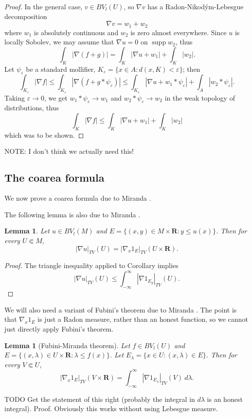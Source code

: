 \documentclass[reqno,12pt,letterpaper]{amsart}
\newcommand{\RR}{\mathbf{R}}
\DeclareMathOperator{\supp}{supp}
\newtheorem{lemma}[theorem]{Lemma}
\theoremstyle{definition}
\numberwithin{equation}{section}
\begin{document}
\begin{proof}
In the general case, $v \in BV_l(U)$, so $\nabla v$ has a Radon-Nikod\'ym-Lebesgue decomposition
$$\nabla v = w_1 + w_2$$
where $w_1$ is absolutely continuous and $w_2$ is zero almost everywhere.
Since $u$ is locally Sobolev, we may assume that $\nabla u = 0$ on $\supp w_2$, thus
$$\int_K |\nabla(f + g)| = \int_K |\nabla u + w_1| + \int_K |w_2|.$$
Let $\psi_\varepsilon$ be a standard mollifier, $K_\varepsilon = \{x \in A: d(x, K) < \varepsilon\}$; then
$$\int_{K_\varepsilon} |\nabla f| \leq \int_{K_\varepsilon} |\nabla (f + g * \psi_\varepsilon)| \leq \int_{K_\varepsilon} |\nabla u + w_1 * \psi_\varepsilon| + \int_A |w_2 * \psi_\varepsilon|.$$
Taking $\varepsilon \to 0$, we get $w_1 * \psi_\varepsilon \to w_1$ and $w_2 * \psi_\varepsilon \to w_2$ in the weak topology of distributions, thus
$$\int_K |\nabla f| \leq \int_K |\nabla u + w_1| + \int_K |w_2|$$
which was to be shown.
\end{proof}
NOTE: I don't think we actually need this!


\subsection{The coarea formula}
We now prove a coarea formula due to Miranda \cite[Teorema 1.6]{Miranda66}.

The following lemma is also due to Miranda \cite[Proposizione 1.9]{Miranda64}.
\begin{lemma}\label{Miranda coarea baby}
Let $u \in BV_l(M)$ and $E = \{(x, y) \in M \times \RR: y \leq u(x)\}$.
Then for every $U \Subset M$,
$$|\nabla u|_{TV}(U) = |\nabla_x 1_E|_{TV}(U \times \RR).$$
\end{lemma}
\begin{proof}
The triangle inequality applied to Corollary implies
$$|\nabla u|_{TV}(U) \leq \int_{-\infty}^\infty |\nabla 1_{E_y}|_{TV}(U).$$
\end{proof}

We will also need a variant of Fubini's theorem due to Miranda \cite[Teorema 3.3]{Miranda64}.
The point is that $\nabla_x 1_E$ is just a Radon measure, rather than an honest function, so we cannot just directly apply Fubini's theorem.
\begin{lemma}[Fubini-Miranda theorem]\label{Fubini Miranda}
Let $f \in BV_l(U)$ and $E = \{(x, \lambda) \in U \times \RR: \lambda \leq f(x)\}$.
Let $E_\lambda = \{x \in U: (x, \lambda) \in E\}$.
Then for every $V \Subset U$,
$$|\nabla_x 1_E|_{TV}(V \times \RR) = \int_{-\infty}^\infty |\nabla 1_{E_\lambda}|_{TV}(V) ~d\lambda.$$
\end{lemma}
TODO Get the statement of this right (probably the integral in $d\lambda$ is an honest integral). Proof. Obviously this works without using Lebesgue measure.
\end{document}
